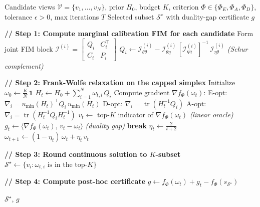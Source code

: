 \documentclass[letterpaper, 9
 pt, conference]{ieeeconf}
\begin{document}
\begin{algorithm}[!t]
\caption{Certifiable Calibration Data Selection}
\label{alg:certifiable_selection}
\begin{algorithmic}[1]
\Require Candidate views $\mathcal{V}=\{v_1,\dots,v_N\}$, prior $H_0$, budget $K$,
         criterion $\Phi \in \{\Phi_E,\Phi_A,\Phi_D\}$,
         tolerance $\epsilon > 0$, max iterations $T$
\Ensure  Selected subset $\mathcal{S}^{\star}$ with duality-gap certificate $g$

\medskip
\State \textbf{// Step 1: Compute marginal calibration FIM for each candidate}
    \State Form joint FIM block $\mathcal{I}^{(i)} = \begin{bmatrix} Q_i & C_i^\top \\ C_i & P_i \end{bmatrix}$
    \State $Q_i \leftarrow \mathcal{I}^{(i)}_{\theta\theta} - \mathcal{I}^{(i)}_{\theta\eta}\,[\mathcal{I}^{(i)}_{\eta\eta}]^{-1}\,\mathcal{I}^{(i)}_{\eta\theta}$
    \quad \textit{(Schur complement)}
\EndFor

\medskip
\State \textbf{// Step 2: Frank-Wolfe relaxation on the capped simplex}
\State Initialize $\omega_0 \leftarrow \frac{K}{N}\,\mathbf{1}$
    \State $H_t \leftarrow H_0 + \sum_{i=1}^{N} \omega_{t,i}\,Q_i$
    \State Compute gradient $\nabla f_\Phi(\omega_t)$: 
    \State \quad E-opt: $\nabla_i = u_{\min}(H_t)^\top Q_i\, u_{\min}(H_t)$
    \State \quad D-opt: $\nabla_i = \operatorname{tr}(H_t^{-1} Q_i)$
    \State \quad A-opt: $\nabla_i = \operatorname{tr}(H_t^{-1} Q_i H_t^{-1})$
    \State $v_t \leftarrow$ top-$K$ indicator of $\nabla f_\Phi(\omega_t)$
    \quad \textit{(linear oracle)}
    \State $g_t \leftarrow \langle \nabla f_\Phi(\omega_t),\, v_t - \omega_t \rangle$
    \quad \textit{(duality gap)}
     \textbf{break} \EndIf
    \State $\eta_t \leftarrow \frac{2}{t+2}$
    \State $\omega_{t+1} \leftarrow (1 - \eta_t)\,\omega_t + \eta_t\, v_t$
\EndFor

\medskip
\State \textbf{// Step 3: Round continuous solution to $K$-subset}
\State $\mathcal{S}^{\star} \leftarrow \{v_i : \omega_{t,i} \text{ is in the top-}K\}$

\medskip
\State \textbf{// Step 4: Compute post-hoc certificate}
\State $g \leftarrow f_\Phi(\omega_t) + g_t - f_\Phi(s_{\mathcal{S}^{\star}})$

\State \Return $\mathcal{S}^{\star}$, $g$
\end{algorithmic}
\end{algorithm}
\end{document}
